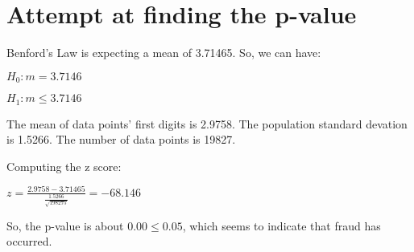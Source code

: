 \documentclass[12pt]{article}
\begin{document}
\section*{Attempt at finding the p-value}

Benford's Law is expecting a mean of 3.71465. So, we can have:

$H_{0}: m = 3.7146$

\vspace{2 mm}

$H_{1}: m \leq 3.7146$

\vspace{2 mm}
\noindent
The mean of data points' first digits is 2.9758.
The population standard devation is 1.5266.
The number of data points is 19827.

\vspace{2 mm}
\noindent
Computing the z score:

\vspace{2 mm}
$z = \frac{2.9758 - 3.71465}{\frac{1.5266}{\sqrt{198275}}} = -68.146$

\vspace{2 mm}
\noindent
So, the p-value is about $0.00 \le 0.05$, which seems to indicate that fraud has occurred.
\end{document}
